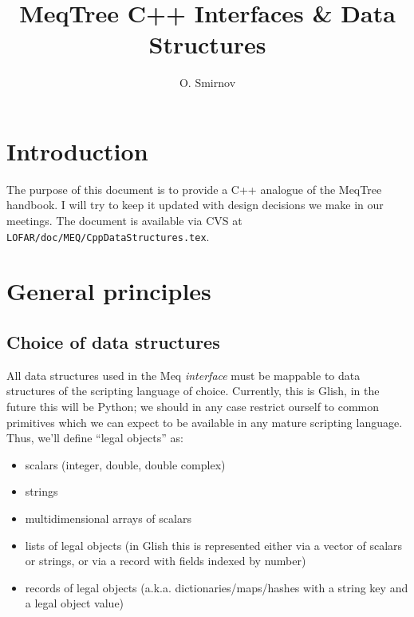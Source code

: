 \documentclass[10pt]{article}
\title{MeqTree C++ Interfaces \& Data Structures}
\author{O. Smirnov}
\begin{document}
\sloppy

\newcommand{\url}[1]{{\tt #1}}

\maketitle

\newcommand{\qq}[1]{{\tt #1}}

\newcommand{\Request}{{\tt Request}}
\newcommand{\RequestId}{{\tt RequestId}}
\newcommand{\Result}{{\tt Result}}
\newcommand{\VellSet}{{\tt VellSet}}
\newcommand{\Cells}{{\tt Cells}}
\newcommand{\Vells}{{\tt Vells}}
\newcommand{\Domain}{{\tt Domain}}
\newcommand{\Node}{{\tt Node}}
\newcommand{\RES}[1]{{\tt RES\_#1}}


\section{Introduction}

The purpose of this document is to provide a C++ analogue of the MeqTree
handbook. I will try to keep it updated with design decisions we make in our
meetings. The document is available via CVS at
\qq{LOFAR/doc/MEQ/CppDataStructures.tex}.

\section{General principles}

\subsection{Choice of data structures}

  All data structures used in the Meq {\em interface} must be mappable to data
  structures of the scripting language of choice. Currently, this is Glish, in
  the future this will be Python; we should in any case restrict ourself to
  common primitives which we can expect to be available in any mature scripting
  language. Thus, we'll define ``legal objects'' as:

  \begin{itemize}
  
  \item scalars (integer, double, double complex)
  
  \item strings
  
  \item multidimensional arrays of scalars
  
  \item lists of legal objects (in Glish this is represented either  via a
    vector of scalars or strings, or via a record with fields indexed by
    number)

  \item records of legal objects (a.k.a. dictionaries/maps/hashes with a string key
    and a legal object value)
    
  \end{itemize}
\end{document}
